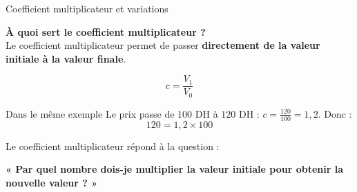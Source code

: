 \documentclass[aspectratio=169,11pt]{beamer}
\begin{document}
	
	
	\begin{frame}{Coefficient multiplicateur et variations}
		
		\textbf{\color{blue}À quoi sert le coefficient multiplicateur ?} \\
		Le coefficient multiplicateur permet de passer
		\textbf{directement de la valeur initiale à la valeur finale}. \vspace{-0.6cm}
	
	\[
	\boxed{
		c=\frac{V_1}{V_0}
	}
	\]
	
	\begin{applicationbox}{Dans le même exemple}
		Le prix passe de $100$ DH à $120$ DH : $	c=\frac{120}{100}=1{,}2$. Donc :
		\[
		\boxed{120=1{,}2\times100}
		\]
	\end{applicationbox}
	Le coefficient multiplicateur répond à la question :
	
	\begin{center}
		\textbf{« Par quel nombre dois-je multiplier la valeur initiale
			pour obtenir la nouvelle valeur ? »}
	\end{center}
\end{frame}
\end{document}

